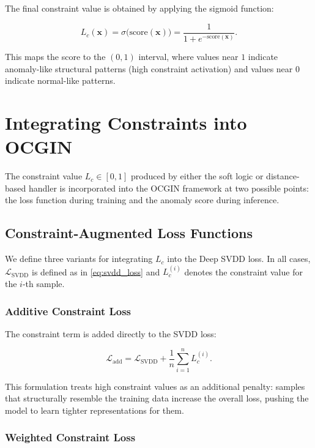 The final constraint value is obtained by applying the sigmoid function:

\begin{equation}
L_c(\mathbf{x}) = \sigma\bigl(\text{score}(\mathbf{x})\bigr) = \frac{1}{1 + e^{-\text{score}(\mathbf{x})}}.
\label{eq:dist_final}
\end{equation}

This maps the score to the $(0, 1)$ interval, where values near $1$ indicate anomaly-like structural patterns (high constraint activation) and values near $0$ indicate normal-like patterns.


\section{Integrating Constraints into OCGIN}
\label{sec:integration}

The constraint value $L_c \in [0, 1]$ produced by either the soft logic or distance-based handler is incorporated into the OCGIN framework at two possible points: the loss function during training and the anomaly score during inference.

\subsection{Constraint-Augmented Loss Functions}
\label{sec:constrained_loss}

We define three variants for integrating $L_c$ into the Deep SVDD loss. In all cases, $\mathcal{L}_{\text{SVDD}}$ is defined as in \eqref{eq:svdd_loss} and $L_c^{(i)}$ denotes the constraint value for the $i$-th sample.

\subsubsection{Additive Constraint Loss}

The constraint term is added directly to the SVDD loss:

\begin{equation}
\mathcal{L}_{\text{add}} = \mathcal{L}_{\text{SVDD}} + \frac{1}{n} \sum_{i=1}^{n} L_c^{(i)}.
\label{eq:loss_add}
\end{equation}

This formulation treats high constraint values as an additional penalty: samples that structurally resemble the training data increase the overall loss, pushing the model to learn tighter representations for them.

\subsubsection{Weighted Constraint Loss}

